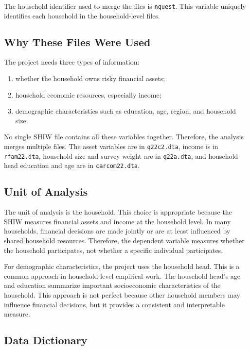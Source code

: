 \documentclass[12pt]{article}
\begin{document}
The household identifier used to merge the files is \texttt{nquest}. This variable uniquely identifies each household in the household-level files.

\subsection{Why These Files Were Used}

The project needs three types of information:

\begin{enumerate}[leftmargin=*]
    \item whether the household owns risky financial assets;
    \item household economic resources, especially income;
    \item demographic characteristics such as education, age, region, and household size.
\end{enumerate}

No single SHIW file contains all these variables together. Therefore, the analysis merges multiple files. The asset variables are in \texttt{q22c2.dta}, income is in \texttt{rfam22.dta}, household size and survey weight are in \texttt{q22a.dta}, and household-head education and age are in \texttt{carcom22.dta}.

\subsection{Unit of Analysis}

The unit of analysis is the household. This choice is appropriate because the SHIW measures financial assets and income at the household level. In many households, financial decisions are made jointly or are at least influenced by shared household resources. Therefore, the dependent variable measures whether the household participates, not whether a specific individual participates.

For demographic characteristics, the project uses the household head. This is a common approach in household-level empirical work. The household head's age and education summarize important socioeconomic characteristics of the household. This approach is not perfect because other household members may influence financial decisions, but it provides a consistent and interpretable measure.

\subsection{Data Dictionary}
\end{document}
